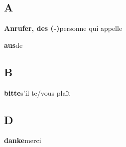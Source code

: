 \documentclass[a5paper, 10pt]{article}
\title{\vskip -4em\bf\Huge\headingfont Lexikon}
\date{}
\newcommand{\lexi}[2]{{\raggedleft\textbf{\textsf{#1}}\hfill{#2}\par}}
\newcommand{\ак}[0]{\char"0301} %
\begin{document}
\maketitle

\begin{multicols}{2}
  \subsection*{A}
  

  \lexi{Anrufer, des (-)}{personne qui appelle}
  \lexi{aus}{de}
  \subsection*{B}
  \lexi{bitte}{s'il te/vous plaît}
  \subsection*{D}
  \lexi{danke}{merci}

\end{multicols}
\end{document}
